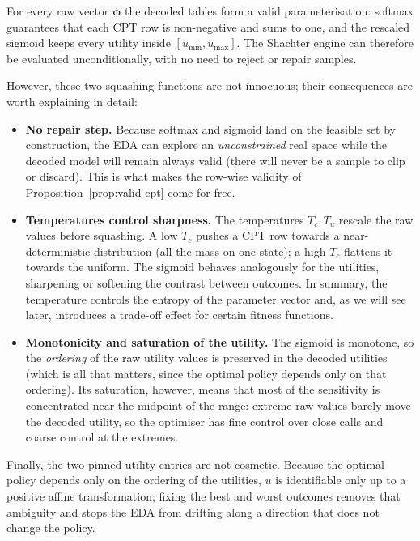 \begin{proposition}
\label{prop:valid-cpt}
For every raw vector $\boldsymbol{\phi}$ the decoded tables form a valid
parameterisation: softmax guarantees that each CPT row is non-negative
and sums to one, and the rescaled sigmoid keeps every utility inside
$[u_{\min},u_{\max}]$. The Shachter engine can therefore be evaluated
unconditionally, with no need to reject or repair samples.
\end{proposition}

However, these two squashing functions are not innocuous; their consequences are
worth explaining in detail:

\begin{itemize}
  \item \textbf{No repair step.} Because softmax and sigmoid land on the
        feasible set by construction, the EDA can explore an
        \emph{unconstrained} real space while the decoded model will remain always
        valid (there will never be a sample to clip or discard).
        This is what makes the row-wise validity of
        Proposition~\ref{prop:valid-cpt} come for free.
  \item \textbf{Temperatures control sharpness.} The temperatures
        $T_c, T_u$ rescale the raw values before squashing. A low $T_c$
        pushes a CPT row towards a near-deterministic distribution (all
        the mass on one state); a high $T_c$ flattens it towards the
        uniform. The sigmoid behaves analogously for the utilities,
        sharpening or softening the contrast between outcomes. In summary, the temperature controls the entropy of the parameter vector and, as we will see later, introduces a trade-off effect for certain fitness functions.
        
  \item \textbf{Monotonicity and saturation of the utility.} The sigmoid
        is monotone, so the \emph{ordering} of the raw utility values
        is preserved in the decoded utilities (which is all that
        matters, since the optimal policy depends only on that ordering).
        Its saturation, however, means that most of the sensitivity is
        concentrated near the midpoint of the range: extreme raw values
        barely move the decoded utility, so the optimiser has fine
        control over close calls and coarse control at the extremes.
\end{itemize}

Finally, the two pinned utility entries are not cosmetic. Because the
optimal policy depends only on the ordering of the utilities, $u$ is
identifiable only up to a positive affine transformation; fixing the
best and worst outcomes removes that ambiguity and stops the EDA from
drifting along a direction that does not change the policy. 

